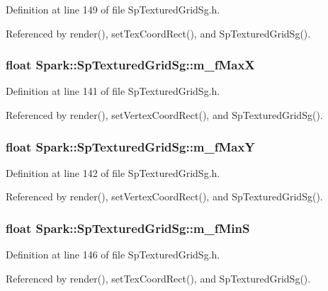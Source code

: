 Definition at line 149 of file Sp\-Textured\-Grid\-Sg.h.

Referenced by render(), set\-Tex\-Coord\-Rect(), and Sp\-Textured\-Grid\-Sg().
\subsubsection{\setlength{\rightskip}{0pt plus 5cm}float {\bf Spark::Sp\-Textured\-Grid\-Sg::m\_\-f\-Max\-X}\hspace{0.3cm}{\tt  [protected]}}\label{classSpark_1_1SpTexturedGridSg_p4}


Definition at line 141 of file Sp\-Textured\-Grid\-Sg.h.

Referenced by render(), set\-Vertex\-Coord\-Rect(), and Sp\-Textured\-Grid\-Sg().
\subsubsection{\setlength{\rightskip}{0pt plus 5cm}float {\bf Spark::Sp\-Textured\-Grid\-Sg::m\_\-f\-Max\-Y}\hspace{0.3cm}{\tt  [protected]}}\label{classSpark_1_1SpTexturedGridSg_p5}


Definition at line 142 of file Sp\-Textured\-Grid\-Sg.h.

Referenced by render(), set\-Vertex\-Coord\-Rect(), and Sp\-Textured\-Grid\-Sg().
\subsubsection{\setlength{\rightskip}{0pt plus 5cm}float {\bf Spark::Sp\-Textured\-Grid\-Sg::m\_\-f\-Min\-S}\hspace{0.3cm}{\tt  [protected]}}\label{classSpark_1_1SpTexturedGridSg_p7}


Definition at line 146 of file Sp\-Textured\-Grid\-Sg.h.

Referenced by render(), set\-Tex\-Coord\-Rect(), and Sp\-Textured\-Grid\-Sg().
